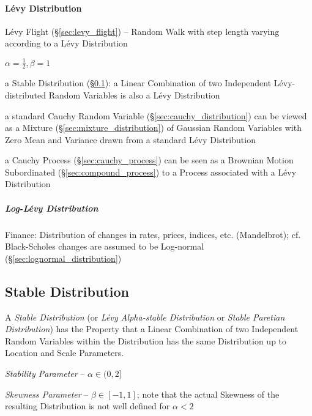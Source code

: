 \paragraph{L\'evy Distribution}\label{sec:levy_distribution}\hfill

L\'evy Flight (\S\ref{sec:levy_flight}) -- Random Walk with step length varying
according to a L\'evy Distribution

$\alpha = \frac{1}{2}, \beta = 1$

a Stable Distribution (\S\ref{sec:stable_distribution}): a Linear Combination of
two Independent L\'evy-distributed Random Variables is also a L\'evy
Distribution

a standard Cauchy Random Variable (\S\ref{sec:cauchy_distribution}) can be
viewed as a Mixture (\S\ref{sec:mixture_distribution}) of Gaussian Random
Variables with Zero Mean and Variance drawn from a standard L\'evy Distribution

a Cauchy Process (\S\ref{sec:cauchy_process}) can be seen as a Brownian Motion
Subordinated (\S\ref{sec:compound_process}) to a Process associated with a
L\'evy Distribution



\subparagraph{Log-L\'evy Distribution}\label{sec:log_levy}\hfill

Finance: Distribution of changes in rates, prices, indices, etc. (Mandelbrot);
cf. Black-Scholes changes are assumed to be Log-normal
(\S\ref{sec:lognormal_distribution})



\subsection{Stable Distribution}\label{sec:stable_distribution}

A \emph{Stable Distribution} (or \emph{L\'evy Alpha-stable Distribution} or
\emph{Stable Paretian Distribution}) has the Property that a Linear Combination
of two Independent Random Variables within the Distribution has the same
Distribution up to Location and Scale Parameters.

\emph{Stability Parameter} -- $\alpha \in (0, 2]$

\emph{Skewness Parameter} -- $\beta \in [-1, 1]$; note that the actual Skewness
of the resulting Distribution is not well defined for $\alpha < 2$

